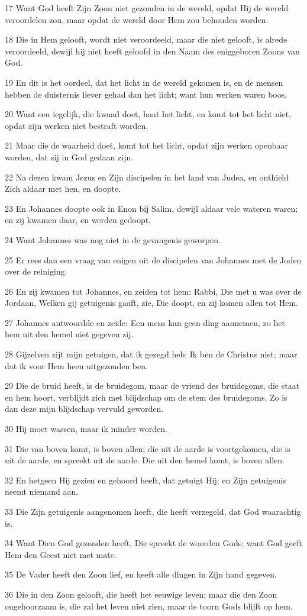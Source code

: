 \par 17 Want God heeft Zijn Zoon niet gezonden in de wereld, opdat Hij de wereld veroordelen zou, maar opdat de wereld door Hem zou behouden worden.
\par 18 Die in Hem gelooft, wordt niet veroordeeld, maar die niet gelooft, is alrede veroordeeld, dewijl hij niet heeft geloofd in den Naam des eniggeboren Zoons van God.
\par 19 En dit is het oordeel, dat het licht in de wereld gekomen is, en de mensen hebben de duisternis liever gehad dan het licht; want hun werken waren boos.
\par 20 Want een iegelijk, die kwaad doet, haat het licht, en komt tot het licht niet, opdat zijn werken niet bestraft worden.
\par 21 Maar die de waarheid doet, komt tot het licht, opdat zijn werken openbaar worden, dat zij in God gedaan zijn.
\par 22 Na dezen kwam Jezus en Zijn discipelen in het land van Judea, en onthield Zich aldaar met hen, en doopte.
\par 23 En Johannes doopte ook in Enon bij Salim, dewijl aldaar vele wateren waren; en zij kwamen daar, en werden gedoopt.
\par 24 Want Johannes was nog niet in de gevangenis geworpen.
\par 25 Er rees dan een vraag van enigen uit de discipelen van Johannes met de Joden over de reiniging.
\par 26 En zij kwamen tot Johannes, en zeiden tot hem: Rabbi, Die met u was over de Jordaan, Welken gij getuigenis gaaft, zie, Die doopt, en zij komen allen tot Hem.
\par 27 Johannes antwoordde en zeide: Een mens kan geen ding aannemen, zo het hem uit den hemel niet gegeven zij.
\par 28 Gijzelven zijt mijn getuigen, dat ik gezegd heb: Ik ben de Christus niet; maar dat ik voor Hem heen uitgezonden ben.
\par 29 Die de bruid heeft, is de bruidegom, maar de vriend des bruidegoms, die staat en hem hoort, verblijdt zich met blijdschap om de stem des bruidegoms. Zo is dan deze mijn blijdschap vervuld geworden.
\par 30 Hij moet wassen, maar ik minder worden.
\par 31 Die van boven komt, is boven allen; die uit de aarde is voortgekomen, die is uit de aarde, en spreekt uit de aarde. Die uit den hemel komt, is boven allen.
\par 32 En hetgeen Hij gezien en gehoord heeft, dat getuigt Hij; en Zijn getuigenis neemt niemand aan.
\par 33 Die Zijn getuigenis aangenomen heeft, die heeft verzegeld, dat God waarachtig is.
\par 34 Want Dien God gezonden heeft, Die spreekt de woorden Gods; want God geeft Hem den Geest niet met mate.
\par 35 De Vader heeft den Zoon lief, en heeft alle dingen in Zijn hand gegeven.
\par 36 Die in den Zoon gelooft, die heeft het eeuwige leven; maar die den Zoon ongehoorzaam is, die zal het leven niet zien, maar de toorn Gods blijft op hem.

